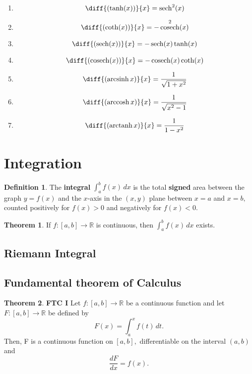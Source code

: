 \documentclass[12pt, a4paper]{article}
\newcommand{\bb}[1]{\mathbb{#1}}
\DeclareMathOperator{\cosech}{cosech}
\DeclareMathOperator{\arccosh}{arccosh}
\DeclareMathOperator{\arcsinh}{arcsinh}
\DeclareMathOperator{\arctanh}{arctanh}
\theoremstyle{definition}
\newtheorem{definition}{Definition}[section]
\newtheorem{theorem}{Theorem}[section]
\theoremstyle{plain}
\begin{document}
\begin{enumerate}

	\item $$\diff{(\tanh(x))}{x}=\sech^2(x)$$

	\item $$\diff{(\coth(x))}{x}=-\cosech^2(x)$$

	\item $$\diff{(\sech(x))}{x}=-\sech(x)\tanh(x)$$

	\item $$\diff{(\cosech(x))}{x}=-\cosech(x)\coth(x)$$
	
	\item $$\diff{(\arcsinh{x})}{x} = \frac{1}{\sqrt{1+x^2}}$$

	\item $$\diff{(\arccosh{x})}{x} = \frac{1}{\sqrt{x^2-1}}$$

	\item $$\diff{(\arctanh{x})}{x} = \frac{1}{1-x^2}$$

\end{enumerate}

\section{Integration}

\begin{definition}
The \textbf{integral} $\int_a^b f(x)\,dx$ is the total \textbf{signed} area between the graph $y=f(x)$ and the $x$-axis in the $(x,y)$ plane between $x=a$ and $x=b,$ counted positively for $f(x)>0$ and negatively for $f(x)<0.$
\end{definition}

\begin{theorem}
If $f:[a,b] \to \bb{R}$ is continuous, then $\int_a^b f(x) \, dx$ exists.
\end{theorem}

\subsection{Riemann Integral}

\subsection{Fundamental theorem of Calculus}

\begin{theorem}
\textbf{FTC I} Let $f:[a,b]\rightarrow \mathbb{R}$ be a continuous function and let $F:[a,b] \rightarrow \mathbb{R}$ be defined by $$F(x) = \int_{a}^{x} f(t) \, dt.$$ Then, F is a continuous function on $[a,b],$ differentiable on the interval $(a,b)$ and $$\frac{dF}{dx} = f(x).$$
\end{theorem}
\end{document}
